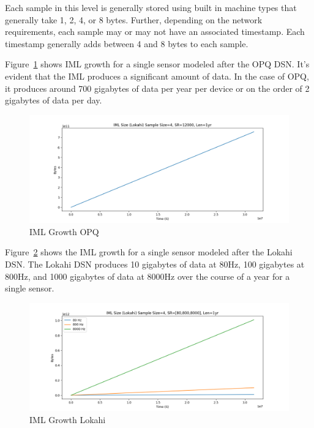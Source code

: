 Each sample in this level is generally stored using built in machine types that generally take 1, 2, 4, or 8 bytes. Further, depending on the network requirements, each sample may or may not have an associated timestamp. Each timestamp generally adds between 4 and 8 bytes to each sample.

Figure~\ref{fig:iml_growth_opq} shows IML growth for a single sensor modeled after the OPQ DSN\@. It's evident that the IML produces a significant amount of data. In the case of OPQ, it produces around 700 gigabytes of data per year per device or on the order of 2 gigabytes of data per day.

\begin{figure}[H]
	\centering
	\includegraphics[width=\linewidth]{figures/plot_iml_level_opq.png}
	\caption{IML Growth OPQ}
	\label{fig:iml_growth_opq}
\end{figure}

Figure~\ref{fig:iml_growth_lokahi} shows the IML growth for a single sensor modeled after the Lokahi DSN\@. The Lokahi DSN produces 10 gigabytes of data at 80Hz, 100 gigabytes at 800Hz, and 1000 gigabytes of data at 8000Hz over the course of a year for a single sensor.

\begin{figure}[H]
	\centering
	\includegraphics[width=\linewidth]{figures/plot_iml_level_lokahi.png}
	\caption{IML Growth Lokahi}
	\label{fig:iml_growth_lokahi}
\end{figure}

